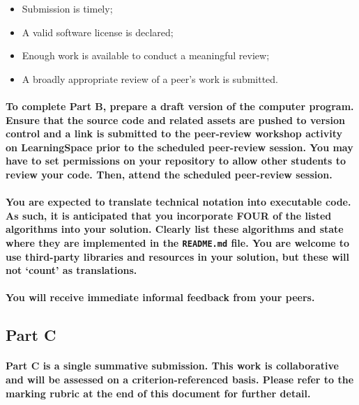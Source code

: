\documentclass{../../fal_assignment}
\begin{document}
\begin{itemize}
	\item Submission is timely;
	\item A valid software license is declared;
	\item Enough work is available to conduct a meaningful review;
	\item A broadly appropriate review of a peer's work is submitted.
\end{itemize}

\paragraph{To complete Part B, prepare a draft version of the computer program. Ensure that the source code and related assets are pushed to version control and a link is submitted to the peer-review workshop activity on LearningSpace prior to the scheduled peer-review session. You may have to set permissions on your repository to allow other students to review your code. Then, attend the scheduled peer-review session.}

\paragraph{You are expected to translate technical notation into executable code. As such, it is anticipated that you incorporate \textbf{FOUR} of the listed algorithms into your solution. Clearly list these algorithms and state where they are implemented in the \texttt{README.md} file. You are welcome to use third-party libraries and resources in your solution, but these will not `count' as translations.}

\paragraph{You will receive immediate \textbf{informal feedback} from your \textbf{peers}.}

\subsection*{Part C}

\paragraph{Part C is a \textbf{single summative submission}. This work is \textbf{collaborative} and will be assessed on a \textbf{criterion-referenced} basis. Please refer to the marking rubric at the end of this document for further detail.}
\end{document}
